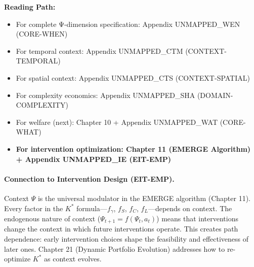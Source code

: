 \begin{cross-reference}
\textbf{Reading Path:}
\begin{itemize}
    \item For complete Ψ-dimension specification: Appendix UNMAPPED_WEN (CORE-WHEN)
    \item For temporal context: Appendix UNMAPPED_CTM (CONTEXT-TEMPORAL)
    \item For spatial context: Appendix UNMAPPED_CTS (CONTEXT-SPATIAL)
    \item For complexity economics: Appendix UNMAPPED_SHA (DOMAIN-COMPLEXITY)
    \item For welfare (next): Chapter 10 + Appendix UNMAPPED_WAT (CORE-WHAT)
    \item \textbf{For intervention optimization: Chapter 11 (EMERGE Algorithm) + Appendix UNMAPPED_IE (EIT-EMP)}
\end{itemize}
\end{cross-reference}

\paragraph{Connection to Intervention Design (EIT-EMP).}
Context $\Psi$ is the universal modulator in the EMERGE algorithm (Chapter 11). Every
factor in the $K^*$ formula---$f_\gamma$, $f_S$, $f_C$, $f_L$---depends on context.
The endogenous nature of context ($\Psi_{t+1} = f(\Psi_t, a_t)$) means that interventions
change the context in which future interventions operate. This creates path dependence:
early intervention choices shape the feasibility and effectiveness of later ones. Chapter 21
(Dynamic Portfolio Evolution) addresses how to re-optimize $K^*$ as context evolves.

